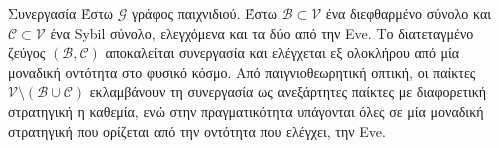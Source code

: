 {}
\begin{definitiongr}{Συνεργασία}
  Έστω $\mathcal{G}$ γράφος παιχνιδιού. Έστω $\mathcal{B} \subset \mathcal{V}$ ένα διεφθαρμένο σύνολο και $\mathcal{C} \subset
  \mathcal{V}$ ένα \textlatin{Sybil} σύνολο, ελεγχόμενα και τα δύο από την \textlatin{Eve}. Το διατεταγμένο ζεύγος
  $\left(\mathcal{B}, \mathcal{C}\right)$ αποκαλείται συνεργασία και ελέγχεται εξ ολοκλήρου από μία μοναδική οντότητα στο
  φυσικό κόσμο. Από παιγνιοθεωρητική οπτική, οι παίκτες $\mathcal{V} \setminus (\mathcal{B} \cup \mathcal{C})$ εκλαμβάνουν τη
  συνεργασία ως ανεξάρτητες παίκτες με διαφορετική στρατηγική η καθεμία, ενώ στην πραγματικότητα υπάγονται όλες σε μία
  μοναδική στρατηγική που ορίζεται από την οντότητα που ελέγχει, την \textlatin{Eve}.
\end{definitiongr}
